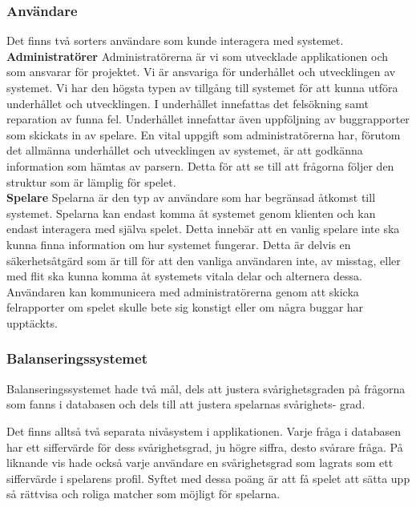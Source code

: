 \documentclass[a4paper, 11pt]{article}
\begin{document}
\subsubsection{Användare}
Det finns två sorters användare som kunde interagera med systemet.
\newline
\textbf{Administratörer} \label{admins}\newline
Administratörerna är vi som utvecklade applikationen och som ansvarar för projektet. Vi är ansvariga för underhållet och utvecklingen av systemet. Vi har den högsta typen av tillgång till systemet för att kunna utföra underhållet och utvecklingen. I underhållet innefattas det felsökning samt reparation av funna fel. Underhållet innefattar även uppföljning av buggrapporter som skickats in av spelare. En vital uppgift som administratörerna har, förutom det allmänna underhållet och utvecklingen av systemet, är att godkänna information som hämtas av parsern. Detta för att se till att frågorna följer den struktur som är lämplig för spelet.\\
\newline
\textbf{Spelare}\newline
Spelarna är den typ av användare som har begränsad åtkomst till systemet. Spelarna kan endast komma åt systemet genom klienten och kan endast interagera med själva spelet. Detta innebär att en vanlig spelare inte ska kunna finna information om hur systemet fungerar. Detta är delvis en säkerhetsåtgärd som är till för att den vanliga användaren inte, av misstag, eller med flit ska kunna komma åt systemets vitala delar och alternera dessa. Användaren kan kommunicera med administratörerna genom att skicka felrapporter om spelet skulle bete sig konstigt eller om några buggar har upptäckts.

\subsubsection{Balanseringssystemet} \label{balanseringssystemet}
Balanseringssystemet hade två mål, dels att justera svårighetsgraden på frågorna som fanns i databasen och dels till att justera spelarnas svårighets-
grad. 

Det finns alltså två separata nivåsystem i applikationen. Varje fråga i databasen har ett siffervärde för dess svårighetsgrad, ju högre siffra, desto svårare fråga. På liknande vis hade också varje användare en svårighetsgrad som lagrats som ett siffervärde i spelarens profil. Syftet med dessa poäng är att få spelet att sätta upp så rättvisa och roliga matcher som möjligt för spelarna. 
\end{document}
